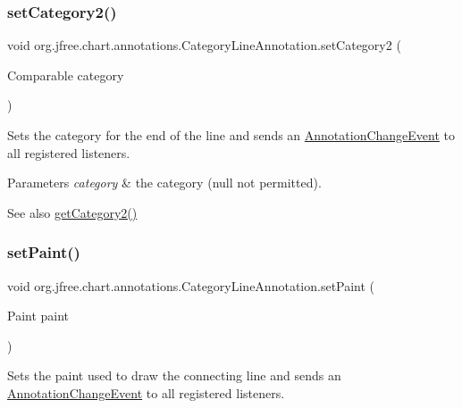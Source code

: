 \subsubsection{\texorpdfstring{set\+Category2()}{setCategory2()}}
{\footnotesize\ttfamily void org.\+jfree.\+chart.\+annotations.\+Category\+Line\+Annotation.\+set\+Category2 (\begin{DoxyParamCaption}\item[{Comparable}]{category }\end{DoxyParamCaption})}

Sets the category for the end of the line and sends an \mbox{\hyperlink{}{Annotation\+Change\+Event}} to all registered listeners.


\begin{DoxyParams}{Parameters}
{\em category} & the category ({\ttfamily null} not permitted).\\
\hline
\end{DoxyParams}
\begin{DoxySeeAlso}{See also}
\mbox{\hyperlink{classorg_1_1jfree_1_1chart_1_1annotations_1_1_category_line_annotation_a66690ee750cd82f99ccf3358fe57007b}{get\+Category2()}} 
\end{DoxySeeAlso}
\mbox{\label{classorg_1_1jfree_1_1chart_1_1annotations_1_1_category_line_annotation_a52c504b2c4291d9d6749f1d6460fbfec}} 
\subsubsection{\texorpdfstring{set\+Paint()}{setPaint()}}
{\footnotesize\ttfamily void org.\+jfree.\+chart.\+annotations.\+Category\+Line\+Annotation.\+set\+Paint (\begin{DoxyParamCaption}\item[{Paint}]{paint }\end{DoxyParamCaption})}

Sets the paint used to draw the connecting line and sends an \mbox{\hyperlink{}{Annotation\+Change\+Event}} to all registered listeners.


